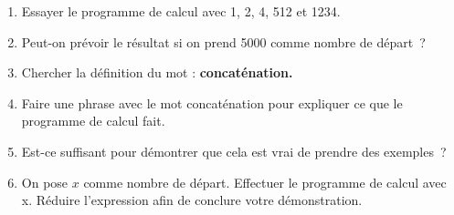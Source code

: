 \documentclass[12pt]{article}
\begin{document}
\begin{enumerate}
  \item Essayer le programme de calcul avec 1, 2, 4, 512 et 1234.
  \item Peut-on prévoir le résultat si on prend 5000 comme nombre de départ ?
  \item Chercher la définition du mot : \textbf{concaténation.}
  \item Faire une phrase avec le mot concaténation pour expliquer ce que le programme de calcul fait.
  \item Est-ce suffisant pour démontrer que cela est vrai de prendre des exemples ?
  \item On pose $x$ comme nombre de départ. Effectuer le programme de calcul avec x. Réduire l’expression afin de conclure votre démonstration.
\end{enumerate}

\newpage

\Pointilles[101]
\end{document}

